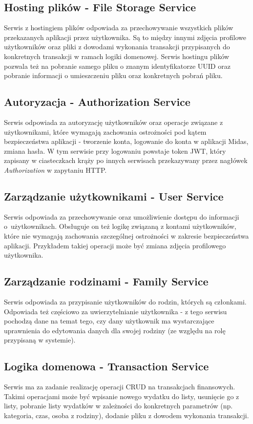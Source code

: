 \documentclass{SGGW-thesis}
\begin{document}
    \subsection{Hosting plików - File Storage Service}
    Serwis z hostingiem plików odpowiada za przechowywanie wszystkich plików przekazanych aplikacji przez użytkownika. Są to między innymi zdjęcia profilowe użytkowników oraz pliki z dowodami wykonania transakcji przypisanych do konkretnych transakcji w ramach logiki domenowej. Serwis hostingu plików pozwala też na pobranie samego pliku o znanym identyfikatorze UUID oraz pobranie informacji o umieszczeniu pliku oraz konkretnych pobrań pliku.
    
    \subsection{Autoryzacja - Authorization Service}
    Serwis odpowiada za autoryzację użytkowników oraz operacje związane z użytkownikami, które wymagają zachowania ostrożności pod kątem bezpieczeństwa aplikacji - tworzenie konta, logowanie do konta w aplikacji Midas, zmiana hasła. W tym serwisie przy logowaniu powstaje token JWT, który zapisany w ciasteczkach krąży po innych serwisach przekazywany przez nagłówek \textit{Authorization} w zapytaniu HTTP. 

    \subsection{Zarządzanie użytkownikami - User Service}
    Serwis odpowiada za przechowywanie oraz umożliwienie dostępu do informacji o~użytkownikach. Obsługuje on też logikę związaną z kontami użytkowników, które nie wymagają zachowania szczególnej ostrożności w zakresie bezpieczeństwa aplikacji. Przykładem takiej operacji może być zmiana zdjęcia profilowego użytkownika.

    \subsection{Zarządzanie rodzinami - Family Service}
    Serwis odpowiada za przypisanie użytkowników do rodzin, których są członkami. Odpowiada też częściowo za uwierzytelnianie użytkownika - z tego serwisu pochodzą dane na temat tego, czy dany użytkownik ma wystarczające uprawnienia do edytowania danych dla swojej rodziny (ze względu na rolę przypisaną w systemie).

    \subsection{Logika domenowa - Transaction Service}
    Serwis ma za zadanie realizację operacji CRUD na transakcjach finansowych. Takimi operacjami może być wpisanie nowego wydatku do listy, usunięcie go z listy, pobranie listy wydatków w zależności do konkretnych parametrów (np. kategoria, czas, osoba z rodziny), dodanie pliku z dowodem wykonania transakcji.
\end{document}
